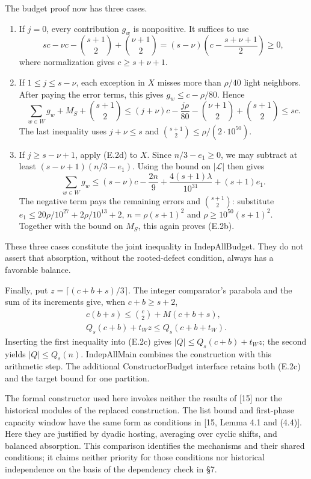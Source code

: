 \documentclass[english,11pt,a4paper]{article}
\providecommand{\tightlist}{\setlength{\itemsep}{0pt}\setlength{\parskip}{0pt}}
\begin{document}
The budget proof now has three cases.

\begin{enumerate}
\def\labelenumi{\arabic{enumi}.}
\tightlist
\item
  If \(j=0\), every contribution \(g_w\) is nonpositive. It suffices to use \[
  sc-\nu c-\binom{s+1}2+\binom{\nu+1}2
  =(s-\nu)\left(c-\frac{s+\nu+1}{2}\right)\ge0,
  \] where normalization gives \(c\ge s+\nu+1\).
\item
  If \(1\le j\le s-\nu\), each exception in \(X\) misses more than \(\rho/40\) light neighbors. After paying the error terms, this gives \(g_w\le c-\rho/80\). Hence \[
  \sum_{w\in W}g_w+M_S+\binom{s+1}2
  \le(j+\nu)c-\frac{j\rho}{80}
       -\binom{\nu+1}2+\binom{s+1}2\le sc.
  \] The last inequality uses \(j+\nu\le s\) and \(\binom{s+1}2\le\rho/(2\cdot10^{50})\).
\item
  If \(j\ge s-\nu+1\), apply (E.2d) to \(X\). Since \(n/3-e_1\ge0\), we may subtract at least \((s-\nu+1)(n/3-e_1)\). Using the bound on \(|\mathcal L|\) then gives \[
  \sum_{w\in W}g_w
  \le (s-\nu)c-\frac{2n}{9}
     +\frac{4(s+1)\lambda}{10^{31}}+(s+1)e_1.
  \] The negative term pays the remaining errors and \(\binom{s+1}2\): substitute \(e_1\le20\rho/10^{27}+2\rho/10^{13}+2\), \(n=\rho(s+1)^2\) and \(\rho\ge10^{50}(s+1)^2\). Together with the bound on \(M_S\), this again proves (E.2b).
\end{enumerate}

These three cases constitute the joint inequality in {\ttfamily\small IndepAllBudg\discretionary{\hbox{\ensuremath{\hookrightarrow}}}{}{}et}. They do not assert that absorption, without the rooted-defect condition, always has a favorable balance.

Finally, put \(z=\lceil(c+b+s)/3\rceil\). The integer comparator's parabola and the sum of its increments give, when \(c+b\ge s+2\), \[
\begin{gathered}
c(b+s)\le\binom c2+M(c+b+s),\\
Q_s(c+b)+t_W z\le Q_s(c+b+t_W).
\end{gathered}
\tag{E.2e}
\] Inserting the first inequality into (E.2c) gives \(|Q|\le Q_s(c+b)+t_W z\); the second yields \(|Q|\le Q_s(n)\). {\ttfamily\small IndepAllMain} combines the construction with this arithmetic step. The additional {\ttfamily\small ConstructorB\discretionary{\hbox{\ensuremath{\hookrightarrow}}}{}{}udget} interface retains both (E.2c) and the target bound for one partition.

The formal constructor used here invokes neither the results of {[}15{]} nor the historical modules of the replaced construction. The list bound and first-phase capacity window have the same form as conditions in {[}15, Lemma 4.1 and (4.4){]}. Here they are justified by dyadic hosting, averaging over cyclic shifts, and balanced absorption. This comparison identifies the mechanisms and their shared conditions; it claims neither priority for those conditions nor historical independence on the basis of the dependency check in §7.
\end{document}
